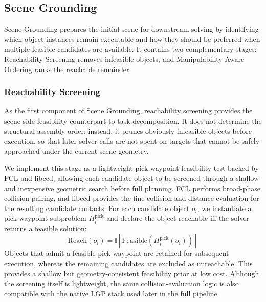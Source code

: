 \documentclass[journal]{IEEEtran}
\begin{document}
  \subsection{Scene Grounding}
  \label{subsec:scene_grounding}

  Scene Grounding prepares the initial scene for downstream solving by identifying which
  object instances remain executable and how they should be preferred when multiple
  feasible candidates are available. It contains two complementary stages:
  Reachability Screening removes infeasible objects, and Manipulability-Aware Ordering
  ranks the reachable remainder.

  \subsubsection{Reachability Screening}
  \label{subsec:phase0}

  As the first component of Scene Grounding, reachability screening provides the
  scene-side feasibility counterpart to task decomposition. It does not determine the
  structural assembly order; instead, it prunes obviously infeasible objects before
  execution, so that later solver calls are not spent on targets that cannot be safely
  approached under the current scene geometry.

  We implement this stage as a lightweight pick-waypoint feasibility test backed by
  FCL and libccd, allowing each candidate object to be screened through a shallow and
  inexpensive geometric search before full planning. FCL performs broad-phase collision
  pairing, and libccd provides the fine collision and distance evaluation for the
  resulting candidate contacts. For each candidate object $o_i$, we instantiate a
  pick-waypoint subproblem $\Pi_i^{\mathrm{pick}}$ and declare the object reachable
  iff the solver returns a feasible solution:
  \begin{equation}
    \mathrm{Reach}(o_i) =
    \mathbb{I}\!\left[
      \mathrm{Feasible}\!\left(\Pi_i^{\mathrm{pick}}(o_i)\right)
    \right]
    \label{eq:reachability}
  \end{equation}
  Objects that admit a feasible pick waypoint are retained for subsequent execution,
  whereas the remaining candidates are excluded as unreachable. This provides a shallow
  but geometry-consistent feasibility prior at low cost. Although the screening itself
  is lightweight, the same collision-evaluation logic is also compatible with the native
  LGP stack used later in the full pipeline.
\end{document}
